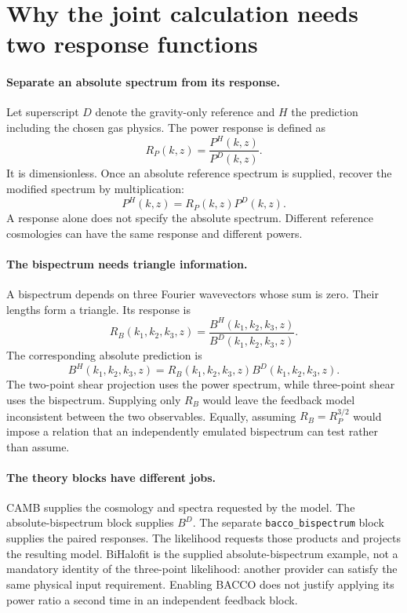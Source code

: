 \documentclass[11pt]{article}
\newcommand{\us}{\_\allowbreak}
\begin{document}
\section{Why the joint calculation needs two response functions}
\paragraph{Separate an absolute spectrum from its response.}
Let superscript $D$ denote the gravity-only reference and $H$ the prediction
including the chosen gas physics. The power response is defined as
\begin{equation}
 R_P(k,z)=\frac{P^H(k,z)}{P^D(k,z)}.
\end{equation}
It is dimensionless. Once an absolute reference spectrum is supplied,
recover the modified spectrum by multiplication:
\begin{equation}
 P^H(k,z)=R_P(k,z)P^D(k,z).
\end{equation}
A response alone does not specify the absolute spectrum. Different
reference cosmologies can have the same response and different powers.

\paragraph{The bispectrum needs triangle information.}
A bispectrum depends on three Fourier wavevectors whose sum is zero.
Their lengths form a triangle. Its response is
\begin{equation}
 R_B(k_1,k_2,k_3,z)=\frac{B^H(k_1,k_2,k_3,z)}{B^D(k_1,k_2,k_3,z)}.
\end{equation}
The corresponding absolute prediction is
\begin{equation}
 B^H(k_1,k_2,k_3,z)=R_B(k_1,k_2,k_3,z)B^D(k_1,k_2,k_3,z).
\end{equation}
The two-point shear projection uses the power spectrum, while three-point
shear uses the bispectrum. Supplying only $R_B$ would leave the feedback
model inconsistent between the two observables. Equally, assuming
$R_B=R_P^{3/2}$ would impose a relation that an independently emulated
bispectrum can test rather than assume.

\paragraph{The theory blocks have different jobs.}
CAMB supplies the cosmology and spectra requested by the model. The
absolute-bispectrum block supplies $B^D$. The separate
\texttt{bacco\us bispectrum} block supplies the paired responses. The
likelihood requests those products and projects the resulting model.
BiHalofit is the supplied absolute-bispectrum example, not a mandatory
identity of the three-point likelihood: another provider can satisfy the
same physical input requirement. Enabling BACCO does not justify applying
its power ratio a second time in an independent feedback block.
\end{document}
